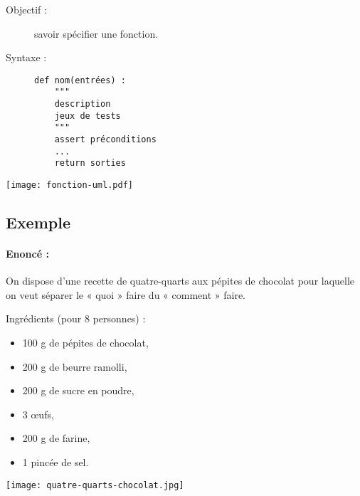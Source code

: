 \noindent\begin{minipage}{7cm}
\begin{description}
\item[Objectif :] savoir spécifier une fonction.
\item[Syntaxe \python :] \mbox{}
\begin{Verbatim}
def nom(entrées) :
    """ 
    description
    jeux de tests
    """
    assert préconditions
    ...
    return sorties
\end{Verbatim}
\end{description}
\end{minipage}
\mbox{}\hfill
\begin{minipage}{8cm}
\texttt{[image: fonction-uml.pdf]}
\end{minipage}

\subsection{Exemple}

\paragraph{Enoncé :} On dispose d'une recette de quatre-quarts aux pépites de chocolat
pour laquelle on veut séparer le « quoi » faire du « comment » faire.
\vspace*{2mm}

\noindent\begin{minipage}{9cm}
Ingrédients (pour 8 personnes) :
\begin{itemize}
\item 100 g de pépites de chocolat,
\item 200 g de beurre ramolli,
\item 200 g de sucre en poudre,
\item 3 \oe ufs,
\item 200 g de farine,
\item 1 pincée de sel.
\end{itemize}
\end{minipage}
\hfill
\begin{minipage}{6cm}
\centerline{\texttt{[image: quatre-quarts-chocolat.jpg]}}
\end{minipage}
\vspace*{2mm}

